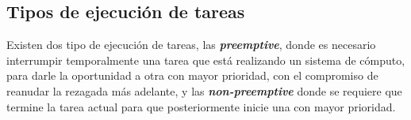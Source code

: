     \subsection{Tipos de ejecución de tareas}

    Existen dos tipo de ejecución de tareas, las \textit{\textbf{preemptive}}, donde es necesario interrumpir temporalmente una tarea que está realizando un sistema de cómputo, para darle la oportunidad a otra con mayor prioridad, con el compromiso de reanudar la rezagada más adelante, y las \textit{\textbf{non-preemptive}} donde se requiere que termine la tarea actual para que posteriormente inicie una con mayor prioridad.

